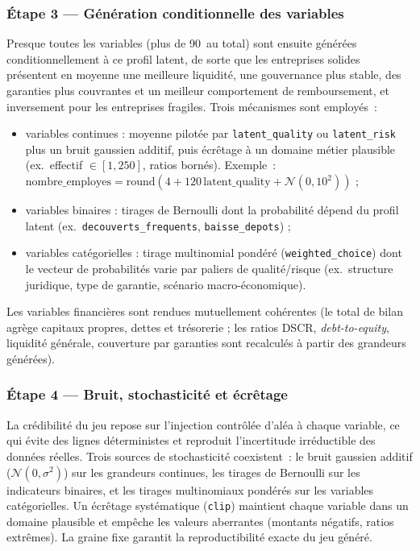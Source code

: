 \documentclass[a4paper,12pt,oneside]{report}
\begin{document}
\subsubsection{Étape 3 --- Génération conditionnelle des variables}

Presque toutes les variables (plus de 90~au total) sont ensuite générées
conditionnellement à ce profil latent, de sorte que les entreprises solides présentent
en moyenne une meilleure liquidité, une gouvernance plus stable, des garanties plus couvrantes
et un meilleur comportement de remboursement, et inversement pour les entreprises fragiles.
Trois mécanismes sont employés~:
\begin{itemize}
  \item variables continues : moyenne pilotée par \texttt{latent\_quality} ou
        \texttt{latent\_risk} plus un bruit gaussien additif, puis écrêtage à un domaine
        métier plausible (ex.\ effectif $\in[1,250]$, ratios bornés). Exemple~:
        $\text{nombre\_employes} = \mathrm{round}(4 + 120\,\text{latent\_quality} + \mathcal{N}(0,10^2))$ ;
  \item variables binaires : tirages de Bernoulli dont la probabilité dépend du profil
        latent (ex.\ \texttt{decouverts\_frequents}, \texttt{baisse\_depots}) ;
  \item variables catégorielles : tirage multinomial pondéré (\texttt{weighted\_choice})
        dont le vecteur de probabilités varie par paliers de qualité/risque (ex.\ structure
        juridique, type de garantie, scénario macro-économique).
\end{itemize}
Les variables financières sont rendues mutuellement cohérentes (le total de bilan agrège
capitaux propres, dettes et trésorerie ; les ratios DSCR, \textit{debt-to-equity},
liquidité générale, couverture par garanties sont recalculés à partir des grandeurs générées).

\subsubsection{Étape 4 --- Bruit, stochasticité et écrêtage}

La crédibilité du jeu repose sur l'injection contrôlée d'aléa à chaque variable, ce qui évite
des lignes déterministes et reproduit l'incertitude irréductible des données réelles. Trois
sources de stochasticité coexistent~: le bruit gaussien additif ($\mathcal{N}(0,\sigma^2)$)
sur les grandeurs continues, les tirages de Bernoulli sur les indicateurs binaires, et
les tirages multinomiaux pondérés sur les variables catégorielles. Un écrêtage
systématique (\texttt{clip}) maintient chaque variable dans un domaine plausible et empêche les
valeurs aberrantes (montants négatifs, ratios extrêmes). La graine fixe garantit la
reproductibilité exacte du jeu généré.
\end{document}
